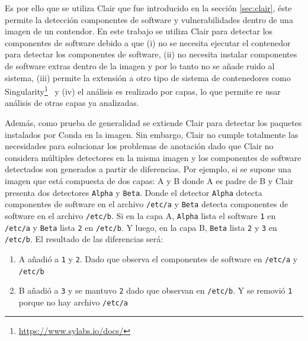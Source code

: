Es por ello que se utiliza Clair que fue introducido en la sección  \ref{sec:clair}, éste permite la detección componentes de software y vulnerabilidades dentro de una imagen de un contendor.
En este trabajo se utiliza Clair para detectar los componentes de software debido a que (i) no se necesita ejecutar el contenedor para detectar los componentes de software, (ii) no necesita instalar componentes de software extras dentro de la imagen y por lo tanto no se añade ruido al sistema, (iii) permite la extensión a otro tipo de sistema de contenedores como Singularity\footnote{\url{https://www.sylabs.io/docs/}}~\cite{kurtzer2017singularity} y (iv) el análisis es realizado por capas, lo que permite re usar análisis de otras capas ya analizadas.

Además, como prueba de generalidad se extiende Clair para detectar los paquetes instalados por Conda en la imagen.  
Sin embargo, Clair no cumple totalmente las necesidades para solucionar los problemas de anotación dado que Clair no considera múltiples detectores en la misma imagen y los componentes de software detectados son generados a partir de diferencias.
Por ejemplo, si se supone una imagen que está compuesta de dos capas: A y B donde A es padre de B y Clair presenta dos detectores \texttt{Alpha} y \texttt{Beta}. Donde el detector \texttt{Alpha} detecta componentes de software en el archivo \verb|/etc/a| y  \texttt{Beta} detecta componentes de software en el archivo \verb|/etc/b|. Si en la capa A, \texttt{Alpha} lista el software \verb|1| en \verb|/etc/a| y \texttt{Beta} lista \verb|2| en  \verb|/etc/b|. Y luego, en la capa B, \texttt{Beta}  lista \verb|2| y \verb|3| en  \verb|/etc/b|. El resultado de las diferencias será: 

\begin{enumerate}
	\item A añadió a \verb|1| y \verb|2|. Dado que observa el componentes de software en \verb|/etc/a| y \verb|/etc/b|
	\item  B añadió a \verb|3| y se mantuvo \verb|2| dado que observan en \verb|/etc/b|. Y se removió \verb|1| porque no hay archivo \verb|/etc/a|
\end{enumerate}

